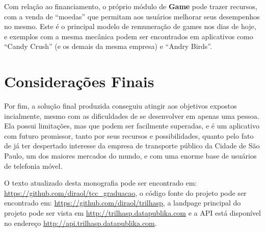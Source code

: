Com relação ao financiamento, o próprio módulo de \textbf{Game} pode trazer recursos, com a venda de ``moedas'' que permitam aos usuários melhorar seus desempenhos no mesmo. Este é o principal modelo de remuneração de games nos dias de hoje, e exemplos com a mesma mecânica podem ser encontrados em aplicativos como ``Candy Crush'' (e os demais da mesma empresa) e ``Andry Birds''.

\section{Considerações Finais}
Por fim, a solução final produzida conseguiu atingir aos objetivos expostos incialmente, mesmo com as dificuldades de se desenvolver em apenas uma pessoa. Ela possui limitações, mas que podem ser facilmente superadas, e é um aplicativo com futuro promissor, tanto por seus recursos e possibilidades, quanto pelo fato de já ter despertado interesse da empresa de transporte público da Cidade de São Paulo, um dos maiores mercados do mundo, e com uma enorme base de usuários de telefonia móvel.

O texto atualizado desta monografia pode ser encontrado em: \\
\url{https://github.com/diraol/tcc_graduacao}, o código fonte do projeto pode ser encontrado em: \url{https://github.com/diraol/trilhasp}, a landpage principal do projeto pode ser vista em \url{http://trilhasp.datapublika.com} e a API está disponível no endereço \url{http://api.trilhasp.datapublika.com}.